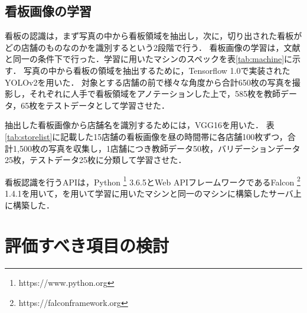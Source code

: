   \subsection{看板画像の学習}
    看板の認識は，まず写真の中から看板領域を抽出し，次に，切り出された看板がどの店舗のものなのかを識別するという2段階で行う．
    看板画像の学習は，文献\cite{Kitamura2018}と同一の条件下で行った．学習に用いたマシンのスペックを表\ref{tab:machine}に示す．
    写真の中から看板の領域を抽出するために，Tensorflow 1.0\cite{abadi2016tensorflow}で実装されたYOLOv2\cite{YOLO9000}を用いた．
    対象とする店舗の前で様々な角度から合計650枚の写真を撮影し，それぞれに人手で看板領域をアノテーションした上で，585枚を教師データ，65枚をテストデータとして学習させた．

    抽出した看板画像から店舗名を識別するためには，VGG16\cite{VGG16}を用いた．
    表\ref{tab:storelist}に記載した15店舗の看板画像を昼の時間帯に各店舗100枚ずつ，合計1,500枚の写真を収集し，1店舗につき教師データ50枚，バリデーションデータ25枚，テストデータ25枚に分類して学習させた．

    看板認識を行うAPIは，Python \footnote{https://www.python.org} 3.6.5とWeb APIフレームワークであるFalcon \footnote{https://falconframework.org} 1.4.1を用いて，を用いて学習に用いたマシンと同一のマシンに構築したサーバ上に構築した．




\section{評価すべき項目の検討}